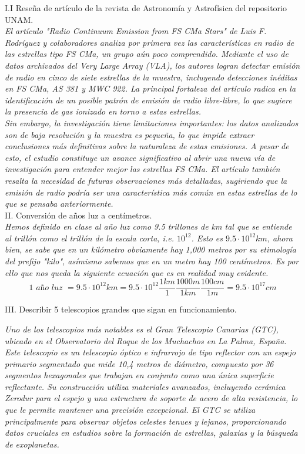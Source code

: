 \documentclass{article}
\begin{document}
I.I Reseña de artículo de la revista de Astronomía y Astrofísica del repositorio UNAM.\\

\textit{El artículo "Radio Continuum Emission from FS CMa Stars" de Luis F. Rodríguez y colaboradores analiza por primera vez las características en radio de las estrellas tipo FS CMa, un grupo aún poco comprendido. Mediante el uso de datos archivados del Very Large Array (VLA), los autores logran detectar emisión de radio en cinco de siete estrellas de la muestra, incluyendo detecciones inéditas en FS CMa, AS 381 y MWC 922. La principal fortaleza del artículo radica en la identificación de un posible patrón de emisión de radio libre-libre, lo que sugiere la presencia de gas ionizado en torno a estas estrellas.}\\

\textit{Sin embargo, la investigación tiene limitaciones importantes: los datos analizados son de baja resolución y la muestra es pequeña, lo que impide extraer conclusiones más definitivas sobre la naturaleza de estas emisiones. A pesar de esto, el estudio constituye un avance significativo al abrir una nueva vía de investigación para entender mejor las estrellas FS CMa. El artículo también resalta la necesidad de futuras observaciones más detalladas, sugiriendo que la emisión de radio podría ser una característica más común en estas estrellas de lo que se pensaba anteriormente.}\\

II. Conversión de años luz a centímetros. \\

\textit{Hemos definido en clase al año luz como 9.5 trillones de km tal que se entiende al trillón como el trillón de la escala corta, i.e. $10^{12}$. Esto es $9.5 \cdot 10^{12}km$, ahora bien, se sabe que en un kilómetro obviamente hay 1,000 metros por su etimología del prefijo "kilo", asímismo sabemos que en un metro hay 100 centímetros. Es por ello que nos queda la siguiente ecuación que es en realidad muy evidente.}
$$ 1\textit{ año luz }= 9.5 \cdot 10^{12}km = 9.5 \cdot 10^{12} \frac{1 km}{1} \frac{1000m}{1km} \frac{100cm}{1m} = 9.5 \cdot 10^{17} cm$$

III. Describir 5 telescopios grandes que sigan en funcionamiento.

\textit{Uno de los telescopios más notables es el Gran Telescopio Canarias (GTC), ubicado en el Observatorio del Roque de los Muchachos en La Palma, España. Este telescopio es un telescopio óptico e infrarrojo de tipo reflector con un espejo primario segmentado que mide 10,4 metros de diámetro, compuesto por 36 segmentos hexagonales que trabajan en conjunto como una única superficie reflectante. Su construcción utiliza materiales avanzados, incluyendo cerámica Zerodur para el espejo y una estructura de soporte de acero de alta resistencia, lo que le permite mantener una precisión excepcional. El GTC se utiliza principalmente para observar objetos celestes tenues y lejanos, proporcionando datos cruciales en estudios sobre la formación de estrellas, galaxias y la búsqueda de exoplanetas.}\\
\end{document}
